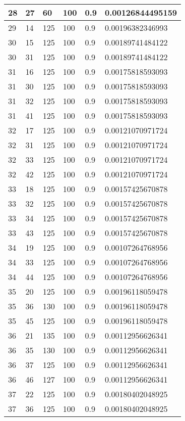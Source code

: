 \begin{longtable}{|l|l|l|l|l|l|}
28 & 27 & 60  & 100 & 0.9 & 0.00126844495159 \\ \hline
29 & 14 & 125 & 100 & 0.9 & 0.00196382346993 \\ \hline
30 & 15 & 125 & 100 & 0.9 & 0.00189741484122 \\ \hline
30 & 31 & 125 & 100 & 0.9 & 0.00189741484122 \\ \hline
31 & 16 & 125 & 100 & 0.9 & 0.00175818593093 \\ \hline
31 & 30 & 125 & 100 & 0.9 & 0.00175818593093 \\ \hline
31 & 32 & 125 & 100 & 0.9 & 0.00175818593093 \\ \hline
31 & 41 & 125 & 100 & 0.9 & 0.00175818593093 \\ \hline
32 & 17 & 125 & 100 & 0.9 & 0.00121070971724 \\ \hline
32 & 31 & 125 & 100 & 0.9 & 0.00121070971724 \\ \hline
32 & 33 & 125 & 100 & 0.9 & 0.00121070971724 \\ \hline
32 & 42 & 125 & 100 & 0.9 & 0.00121070971724 \\ \hline
33 & 18 & 125 & 100 & 0.9 & 0.00157425670878 \\ \hline
33 & 32 & 125 & 100 & 0.9 & 0.00157425670878 \\ \hline
33 & 34 & 125 & 100 & 0.9 & 0.00157425670878 \\ \hline
33 & 43 & 125 & 100 & 0.9 & 0.00157425670878 \\ \hline
34 & 19 & 125 & 100 & 0.9 & 0.00107264768956 \\ \hline
34 & 33 & 125 & 100 & 0.9 & 0.00107264768956 \\ \hline
34 & 44 & 125 & 100 & 0.9 & 0.00107264768956 \\ \hline
35 & 20 & 125 & 100 & 0.9 & 0.00196118059478 \\ \hline
35 & 36 & 130 & 100 & 0.9 & 0.00196118059478 \\ \hline
35 & 45 & 125 & 100 & 0.9 & 0.00196118059478 \\ \hline
36 & 21 & 135 & 100 & 0.9 & 0.00112956626341 \\ \hline
36 & 35 & 130 & 100 & 0.9 & 0.00112956626341 \\ \hline
36 & 37 & 125 & 100 & 0.9 & 0.00112956626341 \\ \hline
36 & 46 & 127 & 100 & 0.9 & 0.00112956626341 \\ \hline
37 & 22 & 125 & 100 & 0.9 & 0.00180402048925 \\ \hline
37 & 36 & 125 & 100 & 0.9 & 0.00180402048925 \\ \hline

\end{longtable}
